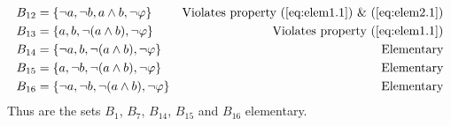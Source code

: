 \begin{example}
\begin{align*}
    B_{12} &= \left\{ \lnot a, \lnot b, a\land b,         \lnot \phi \right\} &\text{Violates property (\ref{eq:elem1.1}) \& (\ref{eq:elem2.1})} \\
    B_{13} &= \left\{ a,       b,       \lnot (a\land b), \lnot \phi \right\} &\text{Violates property (\ref{eq:elem1.1})} \\
    B_{14} &= \left\{ \lnot a, b,       \lnot (a\land b), \lnot \phi \right\} &\text{Elementary} \\
    B_{15} &= \left\{ a,       \lnot b, \lnot (a\land b), \lnot \phi \right\} &\text{Elementary} \\
    B_{16} &= \left\{ \lnot a, \lnot b, \lnot (a\land b), \lnot \phi \right\} &\text{Elementary} 
\end{align*}
Thus are the sets $B_1$, $B_7$, $B_{14}$, $B_{15}$ and $B_{16}$ elementary.
\end{example}